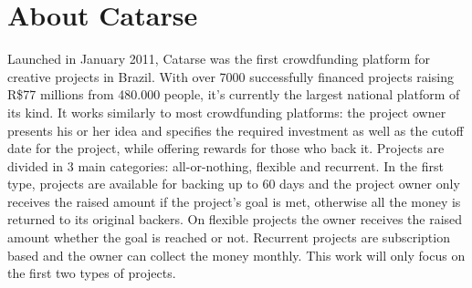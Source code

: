 \documentclass[cic,tc,english]{iiufrgs}
\begin{document}
\chapter{About Catarse}
Launched in January 2011, Catarse was the first crowdfunding platform for creative projects in Brazil. With over 7000 successfully financed projects raising R\$77 millions from 480.000 people, it's currently the largest national platform of its kind. It works similarly to most crowdfunding platforms: the project owner presents his or her idea and specifies the required investment as well as the cutoff date for the project, while offering rewards for those who back it. Projects are divided in 3 main categories: all-or-nothing, flexible and recurrent. In the first type, projects are available for backing up to 60 days and the project owner only receives the raised amount if the project's goal is met, otherwise all the money is returned to its original backers. On flexible projects the owner receives the raised amount whether the goal is reached or not. Recurrent projects are subscription based and the owner can collect the money monthly. This work will only focus on the first two types of projects.

% 


{}
\end{document}
